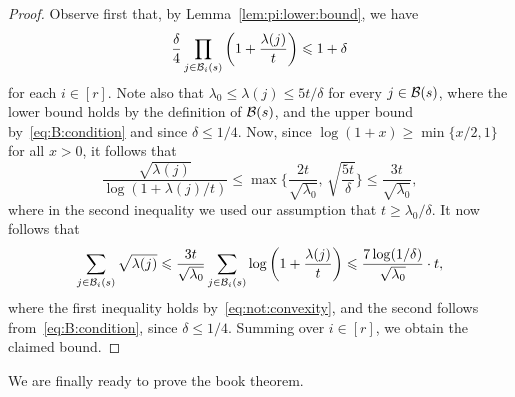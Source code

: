 \begin{proof}
Observe first that, by Lemma~\ref{lem:pi:lower:bound}, we have 
\begin{equation}\label{eq:B:condition}
\frac{\delta}{4} \prod_{j \in \mathcal{B}_i(s)} \bigg( 1 + \frac{\lambda(j)}{t} \bigg) \leqslant 1 + \delta
\end{equation}
for each $i \in [r]$. Note also that $\lambda_0 \le \lambda(j) \le 5t/\delta$ for every $j \in \mathcal{B}(s)$, where the lower bound holds by the definition of $\mathcal{B}(s)$, and the upper bound by~\eqref{eq:B:condition} and since $\delta \le 1/4$. Now, since $\log(1+x) \ge \min\{ x/2,1\}$ for all $x > 0$, it follows that
\begin{equation}\label{eq:not:convexity}
\frac{ \sqrt{\lambda(j)} }{\log(1 + \lambda(j)/t) } \le \max\bigg\{ \frac{ 2t }{ \sqrt{\lambda_0} }, \, \sqrt{ \frac{5t}{\delta}} \bigg\} \le \frac{ 3t }{ \sqrt{\lambda_0} },
\end{equation}
where in the second inequality we used %
our assumption that $t \ge \lambda_0 / \delta$. It now follows that
$$\sum_{j \in \mathcal{B}_i(s)} \sqrt{\lambda(j)} \leqslant \frac{ 3t }{ \sqrt{\lambda_0} } \sum_{j \in \mathcal{B}_i(s)} \log \bigg( 1 + \frac{\lambda(j)}{t} \bigg) \leqslant \frac{7 \log(1/\delta)}{\sqrt{\lambda_0}} \cdot t,$$
where the first inequality holds by~\eqref{eq:not:convexity}, and the second follows from~\eqref{eq:B:condition}, since $\delta \le 1/4$. Summing over $i \in [r]$, we obtain the claimed bound. 
\end{proof}

We are finally ready to prove the book theorem. 

